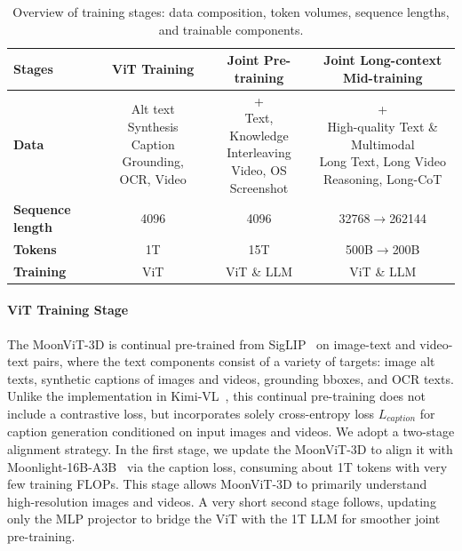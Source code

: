 \begin{table}[t]
\centering
\caption{Overview of training stages: data composition, token volumes, sequence lengths, and trainable components.}
\vspace{0.3em}
\renewcommand{\arraystretch}{1.2} %
\begin{tabular}{lccc}
\toprule
\textbf{Stages} & \textbf{ViT Training} & \textbf{Joint Pre-training} & \textbf{Joint Long-context Mid-training} \\
\midrule
\textbf{Data} & 
\makecell[c]{Alt text \\ Synthesis Caption \\ Grounding, OCR, Video} & %
\makecell[c]{+ \\ Text, Knowledge \\ Interleaving \\ Video, OS Screenshot} & %
\makecell[c]{+ \\ High-quality Text \& Multimodal \\ Long Text, Long Video \\ Reasoning, Long-CoT } \\ %
\midrule
\textbf{Sequence length} & 4096 & 4096 & 32768$\rightarrow$262144 \\
\midrule
\textbf{Tokens} & 1T & 15T & 500B$\rightarrow$200B \\
\midrule
\textbf{Training} & ViT & ViT \& LLM & ViT \& LLM \\
\bottomrule
\end{tabular}
\label{tab:pretrainingdatavolume}
\end{table}
\paragraph{ViT Training Stage}
The MoonViT-3D is continual pre-trained from SigLIP~\cite{zhai2023sigmoidlosslanguageimage} on image-text and video-text pairs, where the text components consist of a variety of targets: image alt texts, synthetic captions of images and videos, grounding bboxes, and OCR texts. Unlike the implementation in Kimi-VL~\cite{team2025kimivl}, this continual pre-training does not include a contrastive loss, but incorporates solely cross-entropy loss ${L}_{caption}$ for caption generation conditioned on input images and videos. We adopt a two-stage alignment strategy. In the first stage, we update the MoonViT-3D to align it with Moonlight-16B-A3B~\citep{liu2025muon} via the caption loss, consuming about 1T tokens with very few training FLOPs. This stage allows MoonViT-3D to primarily understand high-resolution images and videos. A very short second stage follows, updating only the MLP projector to bridge the ViT with the 1T LLM for smoother joint pre-training.

